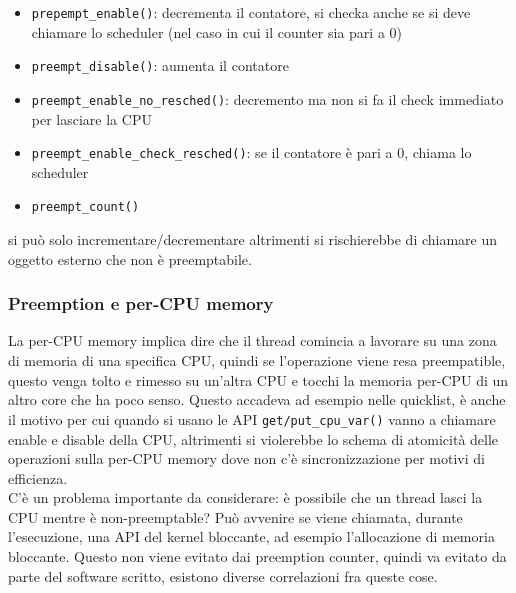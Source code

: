 \documentclass[12pt, oneside]{extbook}
\begin{document}
\begin{itemize}
\item \texttt{prepempt\_enable()}: decrementa il contatore, si checka anche se si deve chiamare lo scheduler (nel caso in cui il counter sia pari a 0)
\item \texttt{preempt\_disable()}: aumenta il contatore
\item \texttt{preempt\_enable\_no\_resched()}: decremento ma non si fa il check immediato per lasciare la CPU
\item \texttt{preempt\_enable\_check\_resched()}: se il contatore è pari a 0, chiama lo scheduler
\item  \texttt{preempt\_count()}
\end{itemize}
si può solo incrementare/decrementare altrimenti si rischierebbe di chiamare un oggetto esterno che non è preemptabile.
\subsubsection{Preemption e per-CPU memory}
La per-CPU memory implica dire che il thread comincia a lavorare su una zona di memoria di una specifica CPU, quindi se l'operazione viene resa preempatible, questo venga tolto e rimesso su un'altra CPU e tocchi la memoria per-CPU di un altro core che ha poco senso. Questo accadeva ad esempio nelle quicklist, è anche il motivo per cui quando si usano le API \texttt{get/put\_cpu\_var()} vanno a chiamare enable e disable della CPU, altrimenti si violerebbe lo schema di atomicità delle operazioni sulla per-CPU memory dove non c'è sincronizzazione per motivi di efficienza.\\ C'è un problema importante da considerare: è possibile che un thread lasci la CPU mentre è non-preemptable? Può avvenire se viene chiamata, durante l'esecuzione, una API del kernel bloccante, ad esempio l'allocazione di memoria bloccante. Questo non viene evitato dai preemption counter, quindi va evitato da parte del software scritto, esistono diverse correlazioni fra queste cose.
\end{document}
